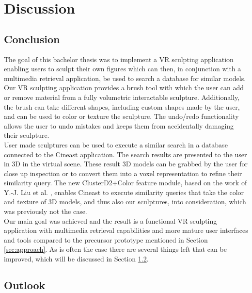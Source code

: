 \chapter{Discussion}

\section{Conclusion}

The goal of this bachelor thesis was to implement a VR sculpting application enabling users to sculpt their own figures which can then, in conjunction with a multimedia retrieval application, be used to search a database for similar models.\\
Our VR sculpting application provides a brush tool with which the user can add or remove material from a fully volumetric interactable sculpture. Additionally, the brush can take different shapes, including custom shapes made by the user, and can be used to color or texture the sculpture. The undo/redo functionality allows the user to undo mistakes and keeps them from accidentally damaging their sculpture.\\
User made sculptures can be used to execute a similar search in a database connected to the Cineast application. The search results are presented to the user in 3D in the virtual scene. These result 3D models can be grabbed by the user for close up inspection or to convert them into a voxel representation to refine their similarity query. The new ClusterD2+Color feature module, based on the work of Y.-J. Liu et al. \cite{cluster_d2_color}, enables Cineast to execute similarity queries that take the color and texture of 3D models, and thus also our sculptures, into consideration, which was previously not the case.\\
Our main goal was achieved and the result is a functional VR sculpting application with multimedia retrieval capabilities and more mature user interfaces and tools compared to the precursor prototype mentioned in Section \ref{sec:approach}. As is often the case there are several things left that can be improved, which will be discussed in Section \ref{sec:future_work}.

\section{Outlook}
\label{sec:future_work}

